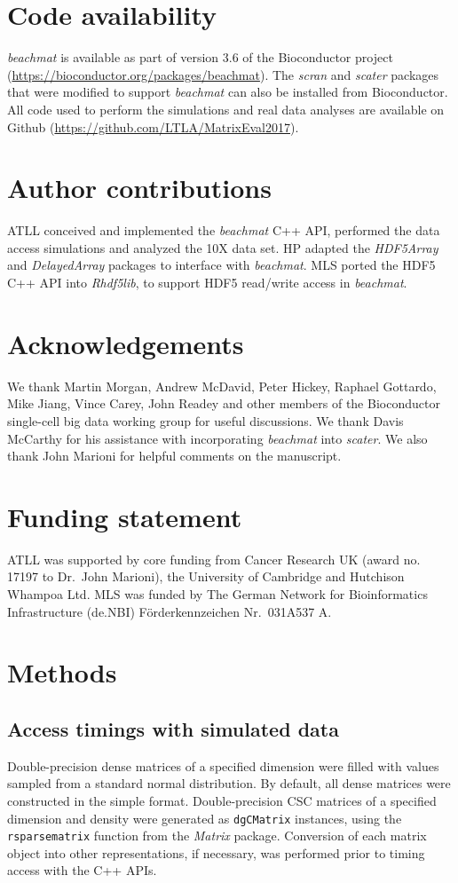 \documentclass[10pt,letterpaper]{article}
\newcommand{\beachmat}{\textit{beachmat}}
\newcommand{\code}[1]{\texttt{#1}}
\begin{document}
\section*{Code availability}
\beachmat{} is available as part of version 3.6 of the Bioconductor project (\url{https://bioconductor.org/packages/beachmat}).
The \textit{scran} and \textit{scater} packages that were modified to support \beachmat{} can also be installed from Bioconductor.
All code used to perform the simulations and real data analyses are available on Github (\url{https://github.com/LTLA/MatrixEval2017}).

\section*{Author contributions}
ATLL conceived and implemented the \beachmat{} C++ API, performed the data access simulations and analyzed the 10X data set.
HP adapted the \textit{HDF5Array} and \textit{DelayedArray} packages to interface with \beachmat{}.
MLS ported the HDF5 C++ API into \textit{Rhdf5lib}, to support HDF5 read/write access in \beachmat{}.

\section*{Acknowledgements}
We thank Martin Morgan, Andrew McDavid, Peter Hickey, Raphael Gottardo, Mike Jiang, Vince Carey, John Readey and other members of the Bioconductor single-cell big data working group for useful discussions.
We thank Davis McCarthy for his assistance with incorporating \beachmat{} into \textit{scater}.
We also thank John Marioni for helpful comments on the manuscript.

\section*{Funding statement}
ATLL was supported by core funding from Cancer Research UK (award no. 17197 to Dr.\ John Marioni), the University of Cambridge and Hutchison Whampoa Ltd.
MLS was funded by The German Network for Bioinformatics Infrastructure (de.NBI) F\"orderkennzeichen Nr.\ 031A537 A.

\section*{Methods}

\subsection*{Access timings with simulated data}
Double-precision dense matrices of a specified dimension were filled with values sampled from a standard normal distribution.
By default, all dense matrices were constructed in the simple format.
Double-precision CSC matrices of a specified dimension and density were generated as \code{dgCMatrix} instances, using the \code{rsparsematrix} function from the \textit{Matrix} package.
Conversion of each matrix object into other representations, if necessary, was performed prior to timing access with the C++ APIs.
\end{document}

